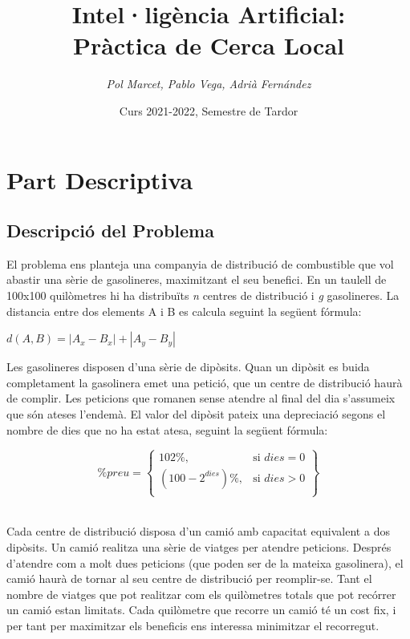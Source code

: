 \documentclass[a4paper]{article}
\title{\textbf{Intel·ligència Artificial:\\
Pràctica de Cerca Local}}
\author{\emph{Pol Marcet, Pablo Vega, Adrià Fernández}}
\date{Curs 2021-2022, Semestre de Tardor}
\begin{document}
\begin{titlepage}
\clearpage\maketitle
\thispagestyle{empty}
\end{titlepage}

\tableofcontents
\clearpage

\section{Part Descriptiva}

\subsection{Descripció del Problema}
El problema ens planteja una companyia de distribució de combustible que vol abastir una sèrie de gasolineres, maximitzant el seu benefici. En un taulell de 100x100 quilòmetres hi ha distribuïts \emph{n} centres de distribució i \emph{g} gasolineres. La distancia entre dos elements A i B es calcula seguint la següent fórmula:

\begin{center}
$d(A,B) = |A_x-B_x|+|A_y-B_y|$
\end{center}

Les gasolineres disposen d'una sèrie de dipòsits. Quan un dipòsit es buida completament la gasolinera emet una petició, que un centre de distribució haurà de complir. Les peticions que romanen sense atendre al final del dia s'assumeix que són ateses l'endemà. El valor del dipòsit pateix una depreciació segons el nombre de dies que no ha estat atesa, seguint la següent fórmula:

\[
\%preu = \left\{\begin{array}{lr}
102\%, & \text{si } dies = 0\\
(100-2^{dies})\%, & \text{si } dies > 0\\
\end{array}\right\}
\]\

Cada centre de distribució disposa d'un camió amb capacitat equivalent a dos dipòsits. Un camió realitza una sèrie de viatges per atendre peticions. Després d'atendre com a molt dues peticions (que poden ser de la mateixa gasolinera), el camió haurà de tornar al seu centre de distribució per reomplir-se. Tant el nombre de viatges que pot realitzar com els quilòmetres totals que pot recórrer un camió estan limitats. Cada quilòmetre que recorre un camió té un cost fix, i per tant per maximitzar els beneficis ens interessa minimitzar el recorregut.\\
\end{document}
